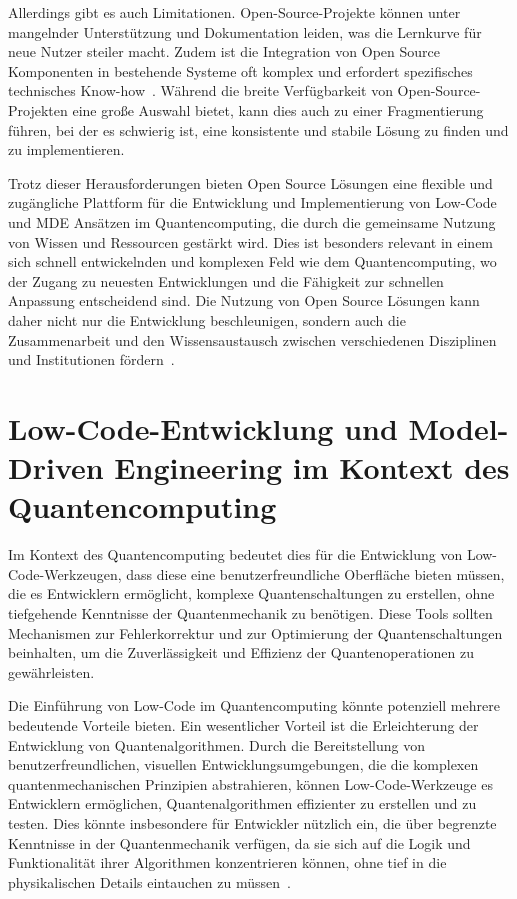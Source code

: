Allerdings gibt es auch Limitationen. Open-Source-Projekte können unter mangelnder Unterstützung und 
Dokumentation leiden, was die Lernkurve für neue Nutzer steiler macht. Zudem ist die Integration von 
Open Source Komponenten in bestehende Systeme oft komplex und erfordert spezifisches technisches 
Know-how~\cite{chesbrough2006open}. Während die breite Verfügbarkeit von Open-Source-Projekten eine große 
Auswahl bietet, kann dies auch zu einer Fragmentierung führen, bei der es schwierig ist, eine konsistente 
und stabile Lösung zu finden und zu implementieren.

Trotz dieser Herausforderungen bieten Open Source Lösungen eine flexible und zugängliche Plattform für 
die Entwicklung und Implementierung von Low-Code und MDE Ansätzen im Quantencomputing, 
die durch die gemeinsame Nutzung von Wissen und Ressourcen gestärkt 
wird. Dies ist besonders relevant in einem sich schnell entwickelnden und komplexen Feld wie dem 
Quantencomputing, wo der Zugang zu neuesten Entwicklungen und die Fähigkeit zur schnellen Anpassung 
entscheidend sind. Die Nutzung von Open Source Lösungen kann daher nicht nur die Entwicklung 
beschleunigen, sondern auch die Zusammenarbeit und den Wissensaustausch zwischen verschiedenen 
Disziplinen und Institutionen fördern~\cite{west2006challenges}.

\section{Low-Code-Entwicklung und Model-Driven Engineering im Kontext des Quantencomputing}
Im Kontext des Quantencomputing bedeutet dies für die Entwicklung von Low-Code-Werkzeugen, dass diese eine 
benutzerfreundliche Oberfläche bieten müssen, die es Entwicklern ermöglicht, komplexe Quantenschaltungen 
zu erstellen, ohne tiefgehende Kenntnisse der Quantenmechanik zu benötigen. Diese Tools sollten Mechanismen 
zur Fehlerkorrektur und zur Optimierung der Quantenschaltungen beinhalten, um die Zuverlässigkeit und 
Effizienz der Quantenoperationen zu gewährleisten. 

Die Einführung von Low-Code im Quantencomputing könnte potenziell mehrere bedeutende Vorteile bieten. 
Ein wesentlicher Vorteil ist die Erleichterung der Entwicklung von Quantenalgorithmen. Durch die 
Bereitstellung von benutzerfreundlichen, visuellen Entwicklungsumgebungen, die die komplexen 
quantenmechanischen Prinzipien abstrahieren, können Low-Code-Werkzeuge es Entwicklern ermöglichen, 
Quantenalgorithmen effizienter zu erstellen und zu testen. Dies könnte insbesondere für Entwickler nützlich 
ein, die über begrenzte Kenntnisse in der Quantenmechanik verfügen, da sie sich auf die Logik und 
Funktionalität ihrer Algorithmen konzentrieren können, ohne tief in die physikalischen Details 
eintauchen zu müssen~\cite{Cabot_2020}.

